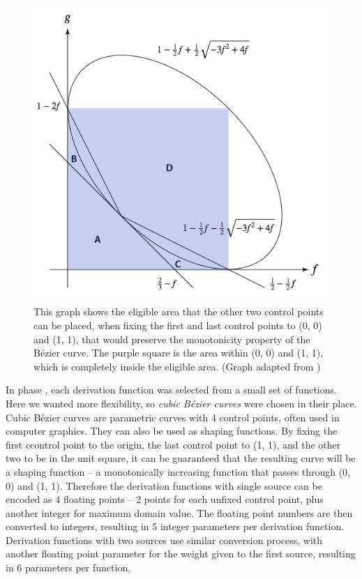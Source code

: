 \begin{figure}
	\centering
	\includegraphics[width=0.7\linewidth]{figures/bezier}
	\caption{This graph shows the eligible area that the other two control points can be placed, when fixing the first and last control points to (0, 0) and (1, 1), that would preserve the monotonicity property of the Bézier curve. The purple square is the area within (0, 0) and (1, 1), which is completely inside the eligible area. (Graph adapted from \cite{web-bezier})}
	\label{fig:bezier}
\end{figure}

In phase , each derivation function was selected from a small set of functions. Here we wanted more flexibility, so \textit{cubic Bézier curves} were chosen in their place. Cubic Bézier curves are parametric curves with 4 control points, often used in computer graphics. They can also be used as shaping functions.\cite{web-flong} By fixing the first ccontrol point to the origin, the last control point to (1, 1), and the other two to be in the unit square, it can be guaranteed that the resulting curve will be a shaping function -- a monotonically increasing function that passes through (0, 0) and (1, 1).\cite{web-flong, web-bezier} Therefore the derivation functions with single source can be encoded as 4 floating points -- 2 points for each unfixed control point, plus another integer for maximum domain value. The floating point numbers are then converted to integers, resulting in 5 integer parameters per derivation function. Derivation functions with two sources use similar conversion process, with another floating point parameter for the weight given to the first source, resulting in 6 parameters per function.

